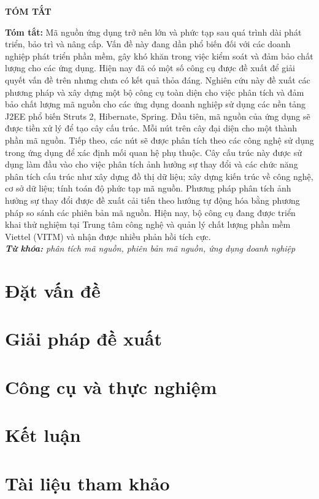 \documentclass[12pt]{article}
\begin{document}
\newpage
\begin{center}
	\textbf{\large TÓM TẮT}
\end{center}
\textbf{Tóm tắt:} Mã nguồn ứng dụng trở nên lớn và phức tạp sau quá trình dài phát triển, bảo trì và nâng cấp. Vấn đề này đang dần phổ biến đối với các doanh nghiệp phát triển phần mềm, gây khó khăn trong việc kiểm soát và đảm bảo chất lượng cho các ứng dụng. Hiện nay đã có một số công cụ được đề xuất để giải quyết vấn đề trên nhưng chưa có kết quả thỏa đáng. Nghiên cứu này đề xuất các phương pháp và xây dựng một bộ công cụ toàn diện cho việc phân tích và đảm bảo chất lượng mã nguồn cho các ứng dụng doanh nghiệp sử dụng các nền tảng J2EE phổ biến Struts 2, Hibernate, Spring. Đầu tiên, mã nguồn của ứng dụng sẽ được tiền xử lý để tạo cây cấu trúc. Mỗi nút trên cây đại diện cho một thành phần mã nguồn. Tiếp theo, các nút sẽ được phân tích theo các công nghệ sử dụng trong ứng dụng để xác định mối quan hệ phụ thuộc. Cây cấu trúc này được sử dụng làm đầu vào cho việc phân tích ảnh hưởng sự thay đổi và các chức năng phân tích cấu trúc như xây dựng đồ thị dữ liệu; xây dựng kiến trúc về công nghệ, cơ sở dữ liệu; tính toán độ phức tạp mã nguồn. Phương pháp phân tích ảnh hưởng sự thay đổi được đề xuất cải tiến theo hướng tự động hóa bằng phương pháp so sánh các phiên bản mã nguồn. Hiện nay, bộ công cụ đang được triển khai thử nghiệm tại Trung tâm công nghệ và quản lý chất lượng phần mềm Viettel (VITM) và nhận được nhiều phản hồi tích cực.\\

\noindent \textit{\textbf{Từ khóa:} phân tích mã nguồn, phiên bản mã nguồn, ứng dụng doanh nghiệp}
\newpage
\tableofcontents


\newpage	
\section{Đặt vấn đề}

\section{Giải pháp đề xuất}
\section{Công cụ và thực nghiệm}
\section{Kết luận}
\section{Tài liệu tham khảo}
\end{document}

